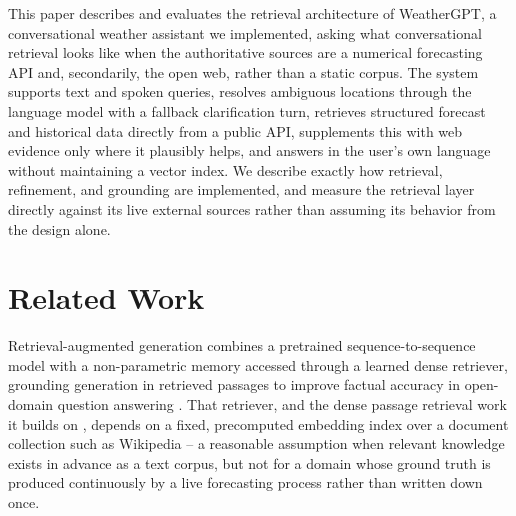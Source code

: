\documentclass[sigconf,natbib=true,anonymous=true]{acmart}
\begin{document}
This paper describes and evaluates the retrieval architecture of WeatherGPT, a conversational weather assistant we implemented, asking what conversational retrieval looks like when the authoritative sources are a numerical forecasting API and, secondarily, the open web, rather than a static corpus. The system supports text and spoken queries, resolves ambiguous locations through the language model with a fallback clarification turn, retrieves structured forecast and historical data directly from a public API, supplements this with web evidence only where it plausibly helps, and answers in the user's own language without maintaining a vector index. We describe exactly how retrieval, refinement, and grounding are implemented, and measure the retrieval layer directly against its live external sources rather than assuming its behavior from the design alone.

\section{Related Work}

Retrieval-augmented generation combines a pretrained sequence-to-sequence model with a non-parametric memory accessed through a learned dense retriever, grounding generation in retrieved passages to improve factual accuracy in open-domain question answering \citep{lewis2020rag}. That retriever, and the dense passage retrieval work it builds on \citep{karpukhin2020dpr}, depends on a fixed, precomputed embedding index over a document collection such as Wikipedia -- a reasonable assumption when relevant knowledge exists in advance as a text corpus, but not for a domain whose ground truth is produced continuously by a live forecasting process rather than written down once.
\end{document}

